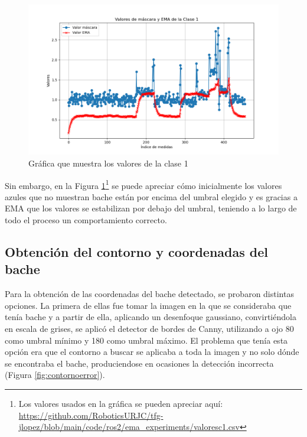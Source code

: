 \begin{figure} [h!]
	\begin{center}
		\includegraphics[width=15cm]{figs/cap7/GraficaC1.png}
	\end{center}
	\caption{Gráfica que muestra los valores de la clase 1}
	\label{fig:diagramaemac1}
\end{figure}

Sin embargo, en la Figura \ref{fig:diagramaemac1}\footnote{Los valores usados en la gráfica se pueden apreciar aquí: \url{https://github.com/RoboticsURJC/tfg-jlopez/blob/main/code/ros2/ema_experiments/valoresc1.csv}} se puede apreciar cómo inicialmente los valores azules que no muestran bache están por encima del umbral elegido y es gracias a EMA que los valores se estabilizan por debajo del umbral, teniendo a lo largo de todo el proceso un comportamiento correcto. 

\subsection{Obtención del contorno y coordenadas del bache}
\label{subsec:expcontorno}

Para la obtención de las coordenadas del bache detectado, se probaron distintas opciones. La primera de ellas fue tomar la imagen en la que se consideraba que tenía bache y a partir de ella, aplicando un desenfoque gaussiano, convirtiéndola en escala de grises, se aplicó el detector de bordes de Canny, utilizando a ojo 80 como umbral mínimo y 180 como umbral máximo. El problema que tenía esta opción era que el contorno a buscar se aplicaba a toda la imagen y no solo dónde se encontraba el bache, produciendose en ocasiones la detección incorrecta (Figura \ref{fig:contornoerror}).

